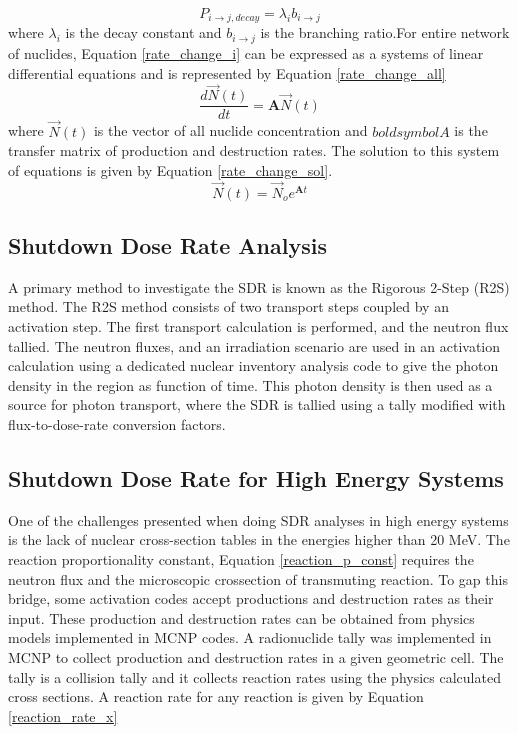 \begin{equation}\label{decay_p_const}
  P_{i \rightarrow j, decay} = \lambda_{i} b_{i \rightarrow j}
\end{equation}
where $\lambda_{i}$ is the decay constant and $b_{i \rightarrow j}$ is
the branching ratio.For entire network of nuclides,
Equation \ref{rate_change_i} can be expressed as
a systems of linear differential equations and is represented by Equation
\ref{rate_change_all}
\begin{equation}\label{rate_change_all}
  \frac{d\vec{N}(t)}{dt} =\boldsymbol{A}  \vec{N}(t)
\end{equation}
where $\vec{N}(t)$ is the vector of all nuclide concentration and $boldsymbol{A}$
is the transfer matrix of production and destruction rates. The solution to this
system of equations is given by Equation \ref{rate_change_sol}.
\begin{equation}\label{rate_change_sol}
  \vec{N}(t) =\vec{N}_{o} e^{\boldsymbol{A}t}
\end{equation}


\subsection{Shutdown Dose Rate Analysis}

A primary method to investigate the SDR is known as the
Rigorous 2-Step (R2S) method. The R2S method consists of two transport steps
coupled by an activation step. 
The first transport calculation is performed, and the neutron flux tallied.
The neutron fluxes, and an irradiation scenario are used in an activation
calculation using a dedicated nuclear inventory analysis code to give the 
photon density in the region as function of time. 
This photon density is then used as a source for photon transport,
where the SDR is tallied using a tally modified with flux-to-dose-rate
conversion factors.

\subsection{Shutdown Dose Rate for High Energy Systems}
One of the challenges presented when doing SDR analyses in high energy systems is the 
lack of nuclear cross-section tables in the energies higher than 20 MeV. 
The reaction proportionality constant, Equation \ref{reaction_p_const}
requires the neutron flux and the microscopic crossection of transmuting reaction. 
To gap this bridge, some activation codes accept productions and destruction rates
as their input. These production and destruction rates can be obtained from
physics models implemented in MCNP codes.
A radionuclide tally was implemented in MCNP to collect production and destruction
rates in a given geometric cell. The tally is a collision tally and
it collects reaction rates using the physics calculated
cross sections. A reaction rate for any reaction is given by Equation
\ref{reaction_rate_x}

